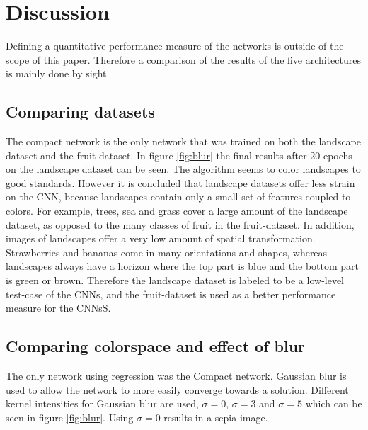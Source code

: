 \section{Discussion}

Defining a quantitative performance measure of the networks is outside of the scope of this paper. Therefore a comparison of the results of the five architectures is mainly done by sight.

\subsection{Comparing datasets}
The compact network is the only network that was trained on both the landscape dataset and the fruit dataset. In figure \ref{fig:blur} the final results after 20 epochs on the landscape dataset can be seen. The algorithm seems to color landscapes to good standards. However it is concluded that landscape datasets offer less strain on the CNN, because landscapes contain only a small set of features coupled to colors. For example, trees, sea and grass cover a large amount of the landscape dataset, as opposed to the many classes of fruit in the fruit-dataset. In addition, images of landscapes offer a very low amount of spatial transformation. Strawberries and bananas come in many orientations and shapes, whereas landscapes always have a horizon where the top part is blue and the bottom part is green or brown. Therefore the landscape dataset is labeled to be a low-level test-case of the CNNs, and the fruit-dataset is used as a better performance measure for the CNNsS.

\subsection{Comparing colorspace and effect of blur}
The only network using regression was the Compact network. Gaussian blur is used to allow the network to more easily converge towards a solution. Different kernel intensities for Gaussian blur are used, $\sigma = 0$, $\sigma = 3$ and $\sigma = 5$ which can be seen in figure \ref{fig:blur}. Using $\sigma = 0 $ results in a sepia image. 

